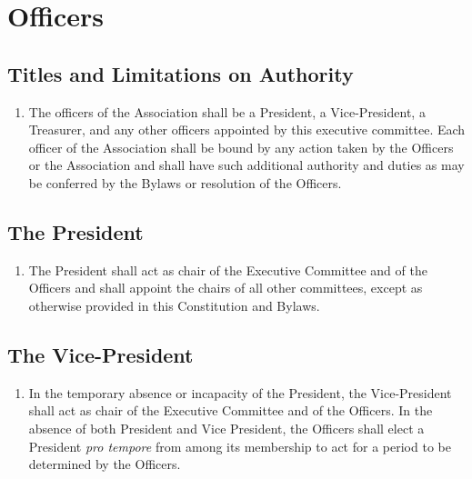 \section{Officers}

\subsection{Titles and Limitations on Authority}
\begin{enumerate}
	\item The officers of the Association shall be a President, a Vice-President, a Treasurer, and any other officers appointed by this executive committee. Each officer of the Association shall be bound by any action taken by the Officers or the Association and shall have such additional authority and duties as may be conferred by the Bylaws or resolution of the Officers.
\end{enumerate}

\subsection{The President}
\begin{enumerate}
	\item The President shall act as chair of the Executive Committee and of the Officers and shall appoint the chairs of all other committees, except as otherwise provided in this Constitution and Bylaws.
\end{enumerate}

\subsection{The Vice-President}
\begin{enumerate}
	\item In the temporary absence or incapacity of the President, the Vice-President shall act as chair of the Executive Committee and of the Officers. In the absence of both President and Vice President, the Officers shall elect a President \textit{pro tempore} from among its membership to act for a period to be determined by the Officers.
\end{enumerate}

